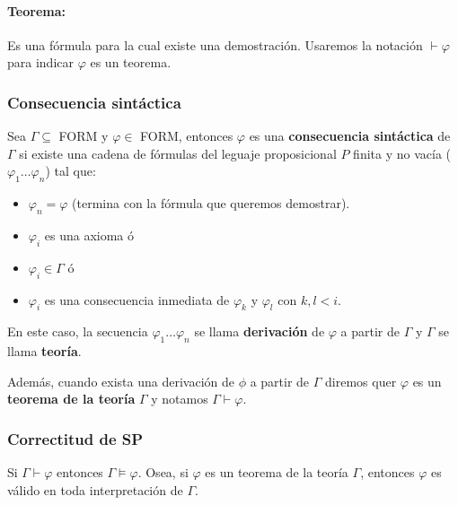 \paragraph{Teorema:} Es una fórmula para la cual existe una demostración. Usaremos la notación $\vdash\varphi$ para indicar $\varphi$ es un teorema.

\subsubsection{Consecuencia sintáctica}
Sea $\Gamma\subseteq$ FORM y $\varphi\in$ FORM, entonces $\varphi$ es una \textbf{consecuencia sintáctica} de $\Gamma$ si existe una cadena de fórmulas del leguaje proposicional  $P$ finita y no vacía ($\varphi_1\dots\varphi_n$) tal que:
\begin{itemize}
	\item $\varphi_n = \varphi$ (termina con la fórmula que queremos demostrar).
	\item $\varphi_i$ es una axioma ó
	\item $\varphi_i\in\Gamma$ ó
	\item $\varphi_i$ es una consecuencia inmediata de $\varphi_k$ y $ \varphi_l$ con $k,l < i$.
\end{itemize}

En este caso, la secuencia $\varphi_1\dots\varphi_n$ se llama \textbf{derivación} de $\varphi$ a partir de $\Gamma$ y $\Gamma$ se llama \textbf{teoría}. 

Además, cuando exista una derivación de $\phi$ a partir de $\Gamma$ diremos quer $\varphi$ es un \textbf{teorema de la teoría} $\Gamma$ y notamos $\Gamma\vdash\varphi$.

\subsubsection{Correctitud de SP}

\begin{teorema}\label{teorema::correctitud}
	Si $\Gamma\vdash\varphi$ entonces $\Gamma\vDash\varphi$. Osea, si $\varphi$ es un teorema de la teoría $\Gamma$, entonces $\varphi$ es válido en toda interpretación de $\Gamma$.
\end{teorema}


